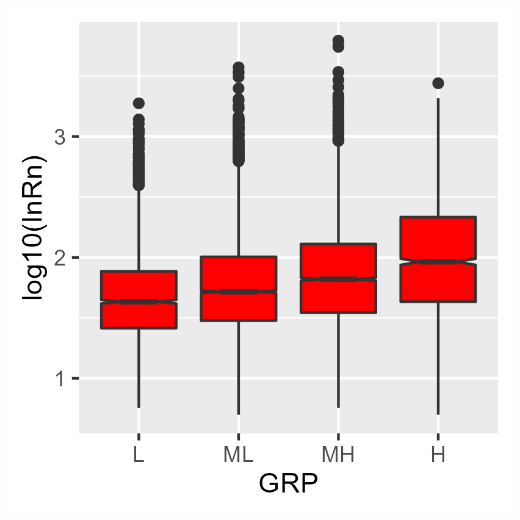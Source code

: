 \documentclass[
  12pt,
]{article}
\begin{document}
\begin{center}\includegraphics[width=0.5\linewidth]{Rresults/Figure_9} \end{center}
\end{document}
